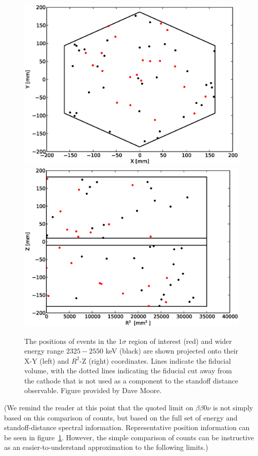 \begin{figure}
\begin{center}
\includegraphics[keepaspectratio=true,width=.49\textwidth]{ROIdistribution_XY.eps}
\includegraphics[keepaspectratio=true,width=.49\textwidth]{ROIdistribution_RZ.eps}
\end{center}
\renewcommand{\baselinestretch}{1}
\small\normalsize
\begin{quote}
\caption{The positions of events in the $1\sigma$ region of interest (red) and wider energy range $2325-2550$ keV (black) are shown projected onto their X-Y (left) and $R^2$-Z (right) coordinates.  Lines indicate the fiducial volume, with the dotted lines indicating the fiducial cut away from the cathode that is not used as a component to the standoff distance observable. Figure provided by Dave Moore.}
\label{fig:ROIEventPositionDistribution}
\end{quote}
\end{figure}
\renewcommand{\baselinestretch}{2}
\small\normalsize

(We remind the reader at this point that the quoted limit on $\beta\beta 0\nu$ is not simply based on this comparison of counts, but based on the full set of energy and standoff-distance spectral information.  Representative position information can be seen in figure~\ref{fig:ROIEventPositionDistribution}.  However, the simple comparison of counts can be instructive as an easier-to-understand approximation to the following limits.)

